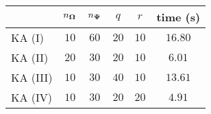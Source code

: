 \centering
\renewcommand{\arraystretch}{1.2}
\begin{tabular}{@{}lccccc@{}}
\toprule
 & $n_{\boldsymbol{\Omega}}$ & $n_{\boldsymbol{\Psi}}$ & $q$ & $r$ & time (s)\\
\midrule
KA (I) & $10$ & $60$ & $20$ & $10$ & $16.80$ \\
KA (II) & $20$ & $30$ & $20$ & $10$ & $6.01$ \\
KA (III) & $10$ & $30$ & $40$ & $10$ & $13.61$ \\
KA (IV) & $10$ & $30$ & $20$ & $20$ & $4.91$ \\
\bottomrule
\end{tabular}
